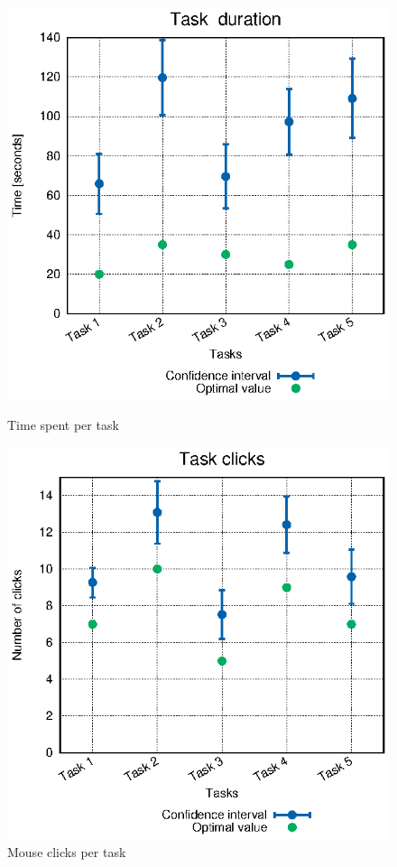 \begin{figure}[!htb]
\centering
\begin{minipage}{.5\textwidth}
  \centering
    \includegraphics[width=\textwidth]{stats/user_times.eps}
    \caption{Time spent per task}
    \label{fig:user_times}
\end{minipage}%
\begin{minipage}{.5\textwidth}
  \centering
    \includegraphics[width=\textwidth]{stats/user_clicks.eps}
    \caption{Mouse clicks per task}
    \label{fig:user_clicks}
\end{minipage}
\end{figure}



